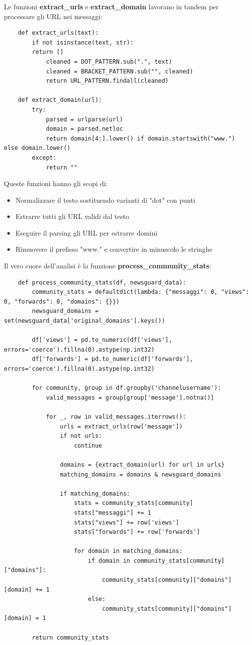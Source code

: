 \documentclass[12pt]{article}
\begin{document}
	Le funzioni \textbf{extract\_urls} e \textbf{extract\_domain} lavorano in tandem per processare gli URL nei messaggi:
	\begin{lstlisting}
	def extract_urls(text):
		if not isinstance(text, str):
		return []
			cleaned = DOT_PATTERN.sub(".", text)
			cleaned = BRACKET_PATTERN.sub("", cleaned)
			return URL_PATTERN.findall(cleaned)
		
	def extract_domain(url):
		try:
			parsed = urlparse(url)
			domain = parsed.netloc
			return domain[4:].lower() if domain.startswith("www.") else domain.lower()
		except:
			return ""
	\end{lstlisting}
	Queste funzioni hanno gli scopi di:
	\begin{itemize}[label=]
		\item Normalizzare il testo sostituendo varianti di "dot" con punti
		\item Estrarre tutti gli URL validi dal testo
		\item Eseguire il parsing gli URL per estrarre domini
		\item Rimuovere il prefisso "www." e convertire in minuscolo le stringhe
	\end{itemize}
	Il vero cuore dell'analisi è la funzione \textbf{process\_community\_stats}:
	\begin{lstlisting}
	def process_community_stats(df, newsguard_data):
		community_stats = defaultdict(lambda: {"messaggi": 0, "views": 0, "forwards": 0, "domains": {}})
		newsguard_domains = set(newsguard_data['original_domains'].keys())
		
		df['views'] = pd.to_numeric(df['views'], errors='coerce').fillna(0).astype(np.int32)
		df['forwards'] = pd.to_numeric(df['forwards'], errors='coerce').fillna(0).astype(np.int32)
		
		for community, group in df.groupby('channelusername'):
			valid_messages = group[group['message'].notna()]
		
			for _, row in valid_messages.iterrows():
				urls = extract_urls(row['message'])
				if not urls:
					continue
		
				domains = {extract_domain(url) for url in urls}
				matching_domains = domains & newsguard_domains
		
				if matching_domains:
					stats = community_stats[community]
					stats["messaggi"] += 1
					stats["views"] += row['views']
					stats["forwards"] += row['forwards']
		
					for domain in matching_domains:
						if domain in community_stats[community]["domains"]:
							community_stats[community]["domains"][domain] += 1
						else:
							community_stats[community]["domains"][domain] = 1
		
		return community_stats
	\end{lstlisting}
\end{document}
